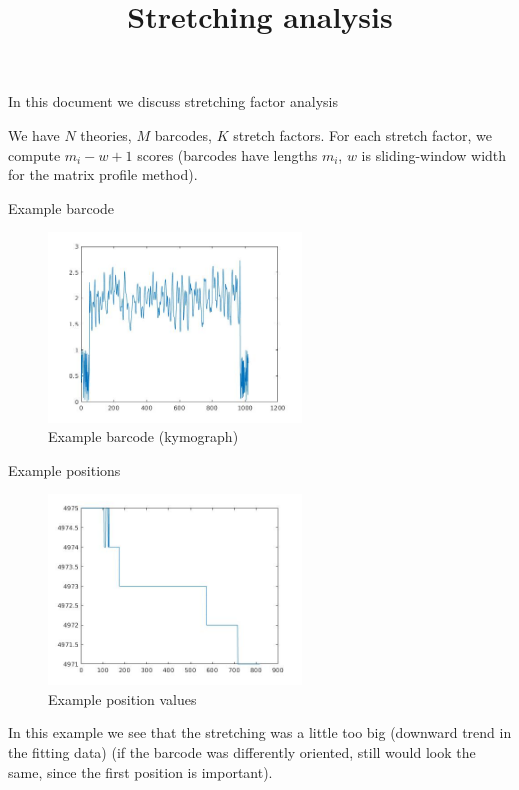 \documentclass{article}
\title{Stretching analysis}
\begin{document}
\maketitle

In this document we discuss stretching factor analysis

We have $N$ theories, $M$ barcodes, $K$ stretch factors. For each stretch factor, we compute $m_i-w+1$ scores (barcodes have lengths $m_i$, $w$ is sliding-window width for the matrix profile method).

Example barcode
\begin{figure}
\includegraphics[width=0.6\textwidth]{kymo1.jpg}
\caption{Example barcode (kymograph)}
\end{figure}

Example positions
\begin{figure}
\includegraphics[width=0.6\textwidth]{pos1.jpg}
\caption{Example position values}
\end{figure}

In this example we see that the stretching was a little too big (downward trend in the fitting data) (if the barcode was differently oriented, still would look the same, since the first position is important).
\end{document}
